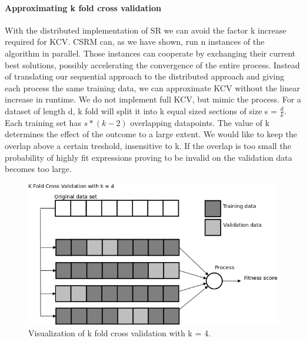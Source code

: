 \paragraph{Approximating k fold cross validation}\label{KCV}
With the distributed implementation of SR we can avoid the factor k increase required for KCV. CSRM can, as we have shown, run n instances of the algorithm in parallel. Those instances can cooperate by exchanging their current best solutions, possibly accelerating the convergence of the entire process. Instead of translating our sequential approach to the distributed approach and giving each process the same training data, we can approximate KCV without the linear increase in runtime. We do not implement full KCV, but mimic the process. For a dataset of length d, k fold will split it into k equal sized sections of size s = $\frac{d}{k}$. Each training set has $s*(k-2)$ overlapping datapoints. The value of k determines the effect of the outcome to a large extent. We would like to keep the overlap above a certain treshold, insensitive to k. If the overlap is too small the probability of highly fit expressions proving to be invalid on the validation data becomes too large. 

\begin{figure}
    \centering
    \includegraphics[width=\textwidth,height=\textheight,keepaspectratio]{figures/kfold.png}
    \caption{Visualization of k fold cross validation with k = 4.}
    \label{fig:kfold}
\end{figure}

